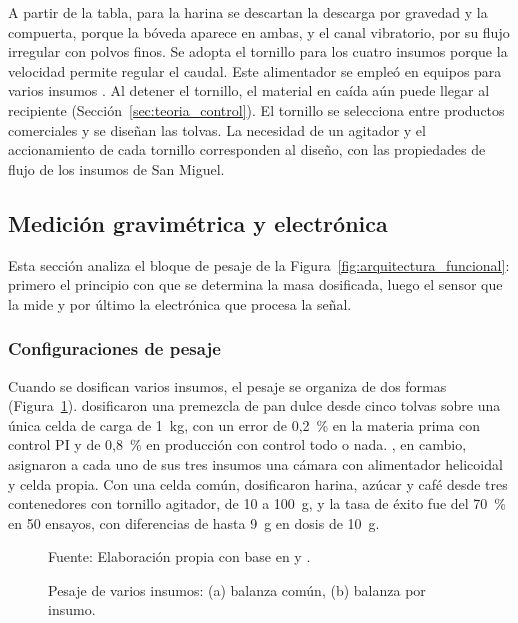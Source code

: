 A partir de la tabla, para la harina se descartan la descarga por gravedad y
la compuerta, porque la bóveda aparece en ambas, y el canal vibratorio, por su
flujo irregular con polvos finos. Se adopta el tornillo para los cuatro
insumos porque la velocidad permite regular el caudal. Este alimentador
se empleó en equipos para varios insumos
\parencite{humaira2024optimalisasi,joni2022powder,david2024granulated,sanchez2024tolvas}.
Al detener el tornillo, el material en caída aún puede llegar al recipiente
(Sección~\ref{sec:teoria_control}). El tornillo se selecciona entre
productos comerciales y se diseñan las tolvas.
La necesidad de un agitador y el accionamiento de cada tornillo corresponden al
diseño, con las propiedades de flujo de los insumos de San Miguel.

\subsection{Medición gravimétrica y electrónica}
\label{sec:teoria_medicion}

Esta sección analiza el bloque de pesaje de la
Figura~\ref{fig:arquitectura_funcional}: primero el principio con que se
determina la masa dosificada, luego el sensor que la mide y por último la
electrónica que procesa la señal.

\subsubsection{Configuraciones de pesaje}
\label{subsec:medicion_configuraciones}

Cuando se dosifican varios insumos, el pesaje se organiza de dos formas
(Figura~\ref{fig:configuraciones_balanza}). \textcite{farihin2021premix}
dosificaron una premezcla de pan dulce desde cinco tolvas sobre una única
celda de carga de 1~kg, con un error de 0,2~\% en la materia prima con control
PI y de 0,8~\% en producción con control todo o nada. \textcite{humaira2024optimalisasi}, en cambio,
asignaron a cada uno de sus tres insumos una cámara con alimentador helicoidal
y celda propia. Con una celda común, \textcite{joni2022powder} dosificaron
harina, azúcar y café desde tres contenedores con tornillo agitador, de 10 a
100~g, y la tasa de éxito fue del 70~\% en 50 ensayos, con diferencias de hasta
9~g en dosis de 10~g.

\begin{figure}[H]
    \centering
    \resizebox{0.9\textwidth}{!}{}
    \caption{Pesaje de varios insumos: (a) balanza común, (b) balanza por insumo.}
    \label{fig:configuraciones_balanza}
    \vspace{0.2em}
    {\footnotesize Fuente: Elaboración propia con base en
    \textcite{farihin2021premix} y \textcite{humaira2024optimalisasi}.}
\end{figure}

